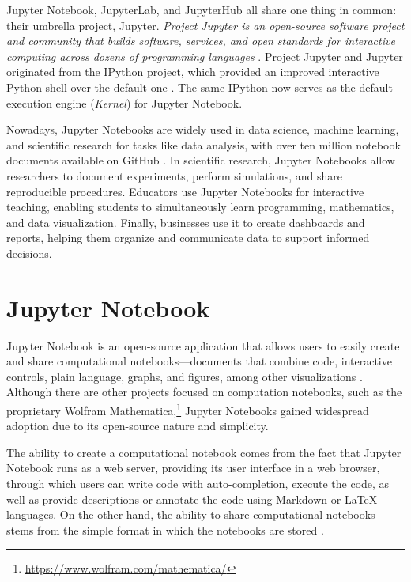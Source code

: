 \documentclass[
  digital,     %
  oneside,     %
  nosansbold,  %
  nocolorbold, %
  lof,         %
  nolot,         %
]{fithesis4}
\begin{document}
Jupyter Notebook, JupyterLab, and JupyterHub all share one thing in common: their umbrella project, Jupyter.
\emph{Project Jupyter is an open-source software project and community that builds software, services, and open standards for interactive computing across dozens of programming languages} \cite{granger2021jupyter}.
Project Jupyter and Jupyter originated from the IPython project, which provided an improved interactive Python shell over the default one \cite{ipython}. The same IPython now serves as the default execution engine (\emph{Kernel}) for Jupyter Notebook.

Nowadays, Jupyter Notebooks are widely used in data science, machine learning, and scientific research for tasks like data analysis, with over ten million notebook documents available on GitHub \cite{granger2021jupyter}. In scientific research, Jupyter Notebooks allow researchers to document experiments, perform simulations, and share reproducible procedures. Educators use Jupyter Notebooks for interactive teaching, enabling students to simultaneously learn programming, mathematics, and data visualization. 
Finally, businesses use it to create dashboards and reports, helping them organize and communicate data to support informed decisions.

\section{Jupyter Notebook}
Jupyter Notebook is an open-source application that allows users to easily create and share computational notebooks---documents that combine code, interactive controls, plain language, graphs, and figures, among other visualizations \cite{granger2021jupyter}. Although there are other projects focused on computation notebooks, such as the proprietary Wolfram Mathematica,\footnote{\url{https://www.wolfram.com/mathematica/}} Jupyter Notebooks gained widespread adoption due to its open-source nature and simplicity.

The ability to create a computational notebook comes from the fact that Jupyter Notebook runs as a web server, providing its user interface in a web browser, through which users can write code with auto-completion, execute the code, as well as provide descriptions or annotate the code using Markdown or LaTeX languages. On the other hand, the ability to share computational notebooks stems from the simple format in which the notebooks are stored \cite{jupyter_notebook}.
\end{document}
